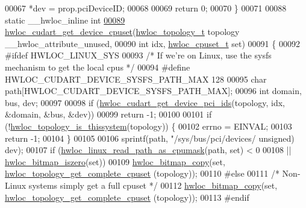 \begin{DoxyCode}
00067   *dev = prop.pciDeviceID;
00068 
00069   \textcolor{keywordflow}{return} 0;
00070 \}
00071 
00088 \textcolor{keyword}{static} \_\_hwloc\_inline \textcolor{keywordtype}{int}
\hyperlink{a00220_ga187ca00c6e12800a25151ce331620980}{00089} \hyperlink{a00220_ga187ca00c6e12800a25151ce331620980}{hwloc\_cudart\_get\_device\_cpuset}(\hyperlink{a00186_ga9d1e76ee15a7dee158b786c30b6a6e38}{hwloc\_topology\_t} topology 
      \_\_hwloc\_attribute\_unused,
00090                                \textcolor{keywordtype}{int} idx, \hyperlink{a00183_ga4bbf39b68b6f568fb92739e7c0ea7801}{hwloc\_cpuset\_t} \textcolor{keyword}{set})
00091 \{
00092 \textcolor{preprocessor}{#ifdef HWLOC\_LINUX\_SYS}
00093   \textcolor{comment}{/* If we're on Linux, use the sysfs mechanism to get the local cpus */}
00094 \textcolor{preprocessor}{#define HWLOC\_CUDART\_DEVICE\_SYSFS\_PATH\_MAX 128}
00095   \textcolor{keywordtype}{char} path[HWLOC\_CUDART\_DEVICE\_SYSFS\_PATH\_MAX];
00096   \textcolor{keywordtype}{int} domain, bus, dev;
00097 
00098   \textcolor{keywordflow}{if} (\hyperlink{a00220_gad8b701d9a34923e34bd58defd4c1e704}{hwloc\_cudart\_get\_device\_pci\_ids}(topology, idx, &domain, &bus, &dev))
00099     \textcolor{keywordflow}{return} -1;
00100 
00101   \textcolor{keywordflow}{if} (!\hyperlink{a00193_ga68ffdcfd9175cdf40709801092f18017}{hwloc\_topology\_is\_thissystem}(topology)) \{
00102     errno = EINVAL;
00103     \textcolor{keywordflow}{return} -1;
00104   \}
00105 
00106   sprintf(path, \textcolor{stringliteral}{"/sys/bus/pci/devices/%
      unsigned}) dev);
00107   \textcolor{keywordflow}{if} (\hyperlink{a00214_gaf72d83e273803226ce772973e37b85de}{hwloc\_linux\_read\_path\_as\_cpumask}(path, \textcolor{keyword}{set}) < 0
00108       || \hyperlink{a00205_ga5b64be28f5a7176ed8ad0d6a90bdf108}{hwloc\_bitmap\_iszero}(\textcolor{keyword}{set}))
00109     \hyperlink{a00205_ga72a29824798b48784b8217471ec8f14c}{hwloc\_bitmap\_copy}(\textcolor{keyword}{set}, \hyperlink{a00202_gaee30e03391c1ed7dfd617fb5c7bbb033}{hwloc\_topology\_get\_complete\_cpuset}
      (topology));
00110 \textcolor{preprocessor}{#else}
00111   \textcolor{comment}{/* Non-Linux systems simply get a full cpuset */}
00112   \hyperlink{a00205_ga72a29824798b48784b8217471ec8f14c}{hwloc\_bitmap\_copy}(\textcolor{keyword}{set}, \hyperlink{a00202_gaee30e03391c1ed7dfd617fb5c7bbb033}{hwloc\_topology\_get\_complete\_cpuset}
      (topology));
00113 \textcolor{preprocessor}{#endif}

\end{DoxyCode}

